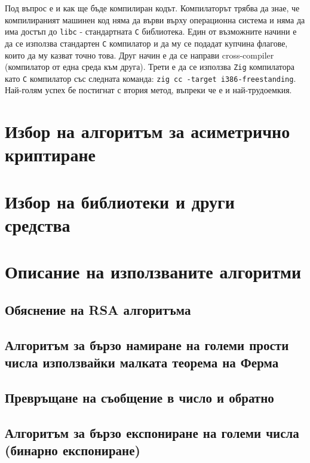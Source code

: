Под въпрос е и как ще бъде компилиран кодът. Компилаторът трябва да знае, че компилираният машинен код няма да върви върху операционна система и няма да има достъп до {\tt libc} - стандартната {\tt C} библиотека. Един от възможните начини е да се използва стандартен {\tt C} компилатор и да му се подадат купчина флагове, които да му казват точно това. Друг начин е да се направи cross-compiler (компилатор от една среда към друга). Трети е да се използва {\tt Zig} компилатора като {\tt C} компилатор със следната команда:
{\tt zig cc -target i386-freestanding}.
Най-голям успех бе постигнат с втория метод, въпреки че е и най-трудоемкия.

\section{Избор на алгоритъм за асиметрично криптиране} %

\section{Избор на библиотеки и други средства}

\section{Описание на използваните алгоритми}
  \subsection{Обяснение на RSA алгоритъма}

  \subsection{Алгоритъм за бързо намиране на големи прости числа използвайки малката теорема на Ферма}

  \subsection{Превръщане на съобщение в число и обратно}

  \subsection{Алгоритъм за бързо експониране на големи числа (бинарно експониране)}

